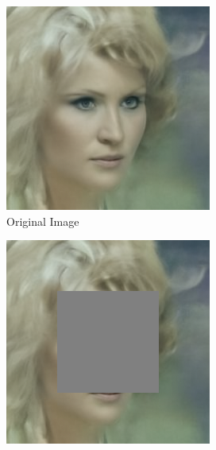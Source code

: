 \begin{figure}[H]
    \centering
    \begin{subfigure}[b]{0.25\textwidth}
        \includegraphics[width=\textwidth]{./figures/ddim_steps10_seed42_img_0}
        \caption{Original Image}
    \end{subfigure}
    \begin{subfigure}[b]{0.25\textwidth}
        \includegraphics[width=\textwidth]{./figures/masked_ddim_steps10_seed42_img_0}

\end{subfigure}
\end{figure}
